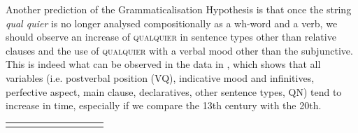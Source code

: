 \documentclass[output=paper]{langscibook}
\begin{document}
  Another prediction of the Grammaticalisation Hypothesis is that once the string \textit{qual quier} is no longer analysed compositionally as a wh-word and a verb, we should observe an increase of \textsc{qualquier} in sentence types other than relative clauses and the use of \textsc{qualquier} with a verbal mood other than the subjunctive. This is indeed what can be observed in the data in , which shows that all variables (i.e. postverbal position (VQ), indicative mood and infinitives, perfective aspect, main clause, declaratives, other sentence types, QN) tend to increase in time, especially if we compare the 13th century with the 20th.


\begin{tabularx}{\textwidth}{XXXXXXXXXX}

\lsptoprule


\end{tabularx}
\end{document}
